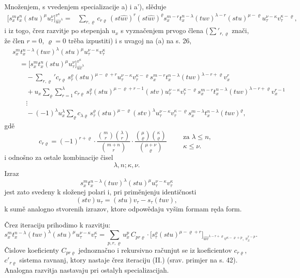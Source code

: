 \documentclass[11pt]{article}
\begin{document}
Množenjem, s vvedenjem specializacije a) i a'), slěduje
\[
\begin{aligned}
\bigl[s_x^m t_x^n(stu)^\mu u_\tau^\nu\bigr]_{\widehat{uv}^{\lambda}}^{v^\kappa}
={}&
\sum_{r,\varrho}c_{r\varrho}\,
(st\widehat{uv})^r(st\widehat{uv})^\varrho
s_x^{m-r}t_x^{n-\lambda}(tuv)^{\lambda-r}(stu)^{\mu-\varrho}
u_\tau^{\nu-\kappa}v_\tau^{\kappa-\varrho},
\end{aligned}
\]
i iz togo, črez razvitje po stepenjah $u_x$ s vyznačenjem prvogo člena ($\sum'_{r,\varrho}$ znači, že člen $r=0$, $\varrho=0$ trěba izpustiti) i s uvagoj na (a) na s. 26,
\[
\tag{II}
\begin{aligned}
&s_x^m t_x^{n-\lambda}(tuv)^\lambda(stu)^\mu u_\tau^{\nu-\kappa}v_\tau^\kappa\\
&\quad =
\bigl[s_x^m t_x^n(stu)^\mu u_\tau^\nu\bigr]_{\widehat{uv}^{\lambda}}^{v^\kappa}\\
&\qquad
-\sum_{r,\varrho}' c_{r\varrho}\,s_\tau^\varrho(stu)^{\mu-\varrho+r}
u_\tau^{\nu-\kappa}v_\tau^{\kappa-\varrho}
s_x^{m-r}t_x^{n-\lambda}(tuv)^{\lambda-r+\varrho}v_x^r\\
&\qquad
+u_x\sum_{\varrho}\sum_{r=1}^{\lambda} c_{r\varrho}\,
s_\tau^\varrho(stu)^{\mu-\varrho+r-1}(stv)
u_\tau^{\nu-\kappa}v_\tau^{\kappa-\varrho}
s_x^{m-r}t_x^{n-\lambda}(tuv)^{\lambda-r+\varrho}v_x^{r-1}\\
&\qquad
\vdots\\
&\qquad
-(-1)^\lambda u_x^\lambda\sum_\varrho c_{\lambda\varrho}\,
s_\tau^\varrho(stu)^{\mu-\varrho}(stv)^\lambda
u_\tau^{\nu-\kappa}v_\tau^{\kappa-\varrho}
s_x^{m-\lambda}t_x^{n-\lambda}(tuv)^\varrho,
\end{aligned}
\]
gdě
\[
c_{r\varrho}=(-1)^{r+\varrho}\cdot
\frac{\binom{m}{r}\binom{\lambda}{r}}{\binom{m+n}{r}}\cdot
\frac{\binom{\mu}{\varrho}\binom{\kappa}{\varrho}}{\binom{\mu+\nu}{\varrho}}
\qquad
\begin{array}{l}
\text{za }\lambda\le n,\\
\kappa\le\nu.
\end{array}
\]
i odnošno za ostale kombinacije čisel
\[\lambda,n;\kappa,\nu.\]
Izraz
\[s_x^m t_x^{n-\lambda}(tuv)^\lambda(stu)^\mu u_\tau^{\nu-\kappa}v_\tau^\kappa\]
jest zato svedeny k složenej polari i, pri priměnjenju identičnosti
\[
(stv)u_\tau=(stu)v_\tau-s_\tau(tuv),
\]
k sumě analogno stvorenih izrazov, ktore odpowědaju vyšim formam ręda form.

Črez iteraciju prihodimo k razvitju:
\[
\tag{III}
s_x^m t_x^{n-\lambda}(tuv)^\lambda(stu)^\mu u_\tau^{\nu-\kappa}v_\tau^\kappa
=
\sum_{p,r,\varrho}u_x^p\,C_{pr\varrho}\cdot
\bigl[s_\tau^\varrho(stu)^{\mu-\varrho+r}\bigr]_{\widehat{uv}^{\lambda-r+\varrho}v^{\kappa-\varrho+p},\,v_x^{r-p}}.
\]
Čislove koeficienty $C_{pr\varrho}$ jednoznačno i rekursivno računjut se iz koeficientov $c_{r\varrho}$, $c'_{r\varrho}$ sistema ravnanj, ktory nastaje črez iteraciju (II.) (srav. primjer na s. 42). Analogna razvitja nastavaju pri ostalyh specializacijah.
\end{document}
